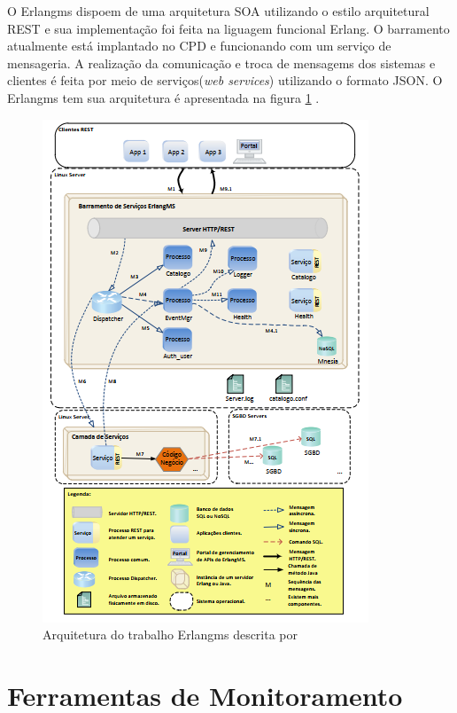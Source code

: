 O Erlangms dispoem de uma arquitetura \acrshort{SOA} utilizando o estilo arquitetural \acrshort{REST} e sua implementação foi feita na liguagem funcional Erlang. O barramento atualmente está implantado no \acrshort{CPD} e  funcionando com um serviço de mensageria. A realização da comunicação e troca de mensagems dos sistemas e clientes é feita por meio de serviços(\textit{web services}) utilizando o formato \acrshort{JSON}. O Erlangms tem sua arquitetura é apresentada na figura \ref{fun:fig:erlangms} .

\begin{figure}[h!]
	\begin{center}
	\includegraphics[scale = 1.20]{img/Arquitetura_ErlangMS.png}
		\caption{Arquitetura do trabalho Erlangms descrita por\cite{Agilar}}
		\label{fun:fig:erlangms}
	\end{center}
\end{figure}

\section{Ferramentas de Monitoramento}

